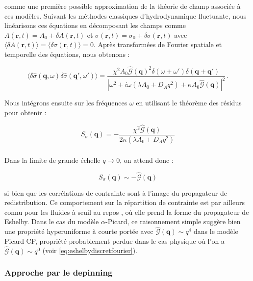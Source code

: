 \noindent comme une première possible approximation de la théorie de champ associée à ces modèles. Suivant les méthodes classiques d'hydrodynamique fluctuante, nous linéarisons ces équations en décomposant les champs comme $A(\bm{r}, t) = A_0 +\delta A(\bm{r}, t)$ et $\sigma(\bm{r}, t) = \sigma_0 +\delta \sigma(\bm{r}, t)$ avec $\langle\delta A(\bm{r}, t)\rangle = \langle \delta \sigma(\bm{r}, t)\rangle = 0 $. Après transformées de Fourier spatiale et temporelle des équations, nous obtenons :

\begin{equation}
    \langle\delta\hat{\sigma}(\bm{q}, \omega)\delta\hat{\sigma}(\bm{q}', \omega')\rangle = \frac{\chi^2 A_0 \hat{\mathcal{G}}(\bm{q})^2 \delta(\omega+\omega')\delta(\bm{q} + \bm{q}')}{|\omega^2 + i\omega (\lambda A_0 + D_A q^2) + \kappa A_0 \hat{\mathcal{G}}(\bm{q})|^2}\, .
\end{equation}

\noindent Nous intégrons ensuite sur les fréquences $\omega$ en utilisant le théorème des résidus pour obtenir :

\begin{equation}
    S_{\sigma}(\mathbf{q}) = -\frac{\chi^2\hat{\mathcal{G}}(\bm{q})}{2\kappa(\lambda A_0 + D_A q^2)}
\end{equation}

\subparagraph{}Dans la limite de grande échelle $q\rightarrow 0$, on attend donc :

\begin{equation}
    S_{\sigma}(\mathbf{q}) \sim -\hat{\mathcal{G}}(\bm{q})
\end{equation}

\noindent si bien que les corrélations de contrainte sont à l'image du propagateur de redistribution. Ce comportement sur la répartition de contrainte est par ailleurs connu pour les fluides à seuil au repos \cite{lerner_simple_2020}, où elle prend la forme du propagateur de Eshelby. Dans le cas du modèle $\alpha$-Picard, ce raisonnement simple suggère bien une propriété hyperuniforme à courte portée avec $\hat{\mathcal{G}}(\bm{q})\sim q^4$ dans le modèle Picard-CP, propriété probablement perdue dans le cas physique où l'on a $\hat{\mathcal{G}}(\bm{q})\sim q^0$ (voir \autoref{eq:eshelbydiscretfourier}).

\subsubsection{Approche par le depinning}

